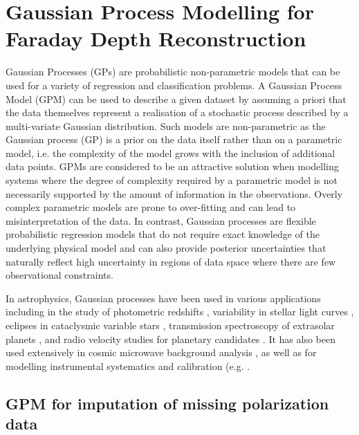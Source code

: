 \documentclass[fleqn,usenatbib]{mnras}
\begin{document}
\section{Gaussian Process Modelling for Faraday Depth Reconstruction}
\label{sec:astrogpm}

Gaussian Processes (GPs) are probabilistic non-parametric models that can be used for a variety of regression and classification problems. A Gaussian Process Model (GPM) can be used to describe a given dataset by assuming a priori that the data themselves represent a realisation of a stochastic process described by a multi-variate Gaussian distribution. Such models are non-parametric as the Gaussian process (GP) is a prior on the data itself rather than on a parametric model, i.e. the complexity of the model grows with the inclusion of additional data points. GPMs are considered to be an attractive solution when modelling systems where the degree of complexity required by a parametric model is not necessarily supported by the amount of information in the observations. Overly complex parametric models are prone to over-fitting and can lead to misinterpretation of the data. In contrast, Gaussian processes are flexible probabilistic regression models that do not require exact knowledge of the underlying physical model and can also provide posterior uncertainties that naturally reflect high uncertainty in regions of data space where there are few observational constraints.

In astrophysics, Gaussian processes have been used in various applications including in the study of photometric redshifts \citep{wa06300n}, variability in stellar light curves \citep{2018MNRAS.474.2094A}, eclipses in cataclysmic variable stars \citep{10.1093/mnras/stw2417}, transmission spectroscopy of extrasolar planets \citep{2012MNRAS.419.2683G}, and radio velocity studies for planetary candidates \citep{10.1093/mnras/stv1428}. It has also been used extensively in cosmic microwave background analysis \citep{1987MNRAS.226..655B, 1999CoScE...1...21B, PhysRevD.67.023001}, as well as for modelling instrumental systematics and calibration (e.g. \cite{2012MNRAS.419.2683G, 2014MNRAS.443.2517H, 2015ApJ...800...46B, Czekala_2015, 2015MNRAS.451..680E, 10.1093/mnras/stv1428, 2015Natur.526..546V, 2016MNRAS.459.2408A, 2016MNRAS.456L...6R, 2017MNRAS.466.4250L}.

\subsection{GPM for imputation of missing polarization data}
\label{sec:imputation}
\end{document}
